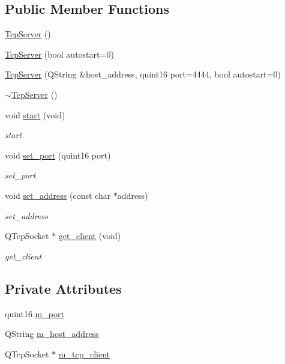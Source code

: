 \subsection*{Public Member Functions}
\begin{DoxyCompactItemize}
\item 
\hyperlink{class_tcp_server_abc977059ef61f1c42f5fda1bc5945ab0}{Tcp\+Server} ()
\item 
\hyperlink{class_tcp_server_af43d51237b45ebb729911d829dfa7856}{Tcp\+Server} (bool autostart=0)
\item 
\hyperlink{class_tcp_server_a5242d1465353dd6e57bf556416021598}{Tcp\+Server} (Q\+String \&host\+\_\+address, quint16 port=4444, bool autostart=0)
\item 
\hyperlink{class_tcp_server_a728a9e31c53cf86887f1f6149b1c46dd}{$\sim$\+Tcp\+Server} ()
\item 
void \hyperlink{class_tcp_server_ab9a387d38fd311ae853b4b4006504096}{start} (void)
\begin{DoxyCompactList}\small\item\em start \end{DoxyCompactList}\item 
void \hyperlink{class_tcp_server_aaf6005b12641ab81bcf91099d9255437}{set\+\_\+port} (quint16 port)
\begin{DoxyCompactList}\small\item\em set\+\_\+port \end{DoxyCompactList}\item 
void \hyperlink{class_tcp_server_a3496c0dfa5e3c1cb5bf794739508eda4}{set\+\_\+address} (const char $\ast$address)
\begin{DoxyCompactList}\small\item\em set\+\_\+address \end{DoxyCompactList}\item 
Q\+Tcp\+Socket $\ast$ \hyperlink{class_tcp_server_a321f1064fd590efdeb1f9458b89afdca}{get\+\_\+client} (void)
\begin{DoxyCompactList}\small\item\em get\+\_\+client \end{DoxyCompactList}\end{DoxyCompactItemize}
\subsection*{Private Attributes}
\begin{DoxyCompactItemize}
\item 
quint16 \hyperlink{class_tcp_server_a01d5a7bfe29ae6632180be7899d3740f}{m\+\_\+port}
\item 
Q\+String \hyperlink{class_tcp_server_aa8fd2e3eebacb69a7f785ffcc2a69eee}{m\+\_\+host\+\_\+address}
\item 
Q\+Tcp\+Socket $\ast$ \hyperlink{class_tcp_server_a34a159e3301900eac7bf08346fc3615b}{m\+\_\+tcp\+\_\+client}
\end{DoxyCompactItemize}


